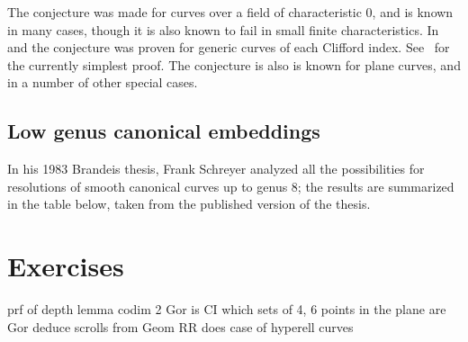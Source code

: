 The conjecture was made for curves over a field of characteristic 0, and is known in many cases, though it is also known to fail in small finite characteristics.
In \cite{MR1941089} and \cite{MR2157134} the conjecture was proven for generic curves of each Clifford index.  See~\cite{MR4022070} for the currently simplest
proof. The conjecture is also is known for plane curves, and in a number of other special cases. 

\subsection{Low genus canonical embeddings} 
In his 1983 Brandeis thesis, Frank Schreyer analyzed all the possibilities for resolutions of smooth canonical curves up to genus 8; the results are summarized in the table below, taken from the published version \cite{Schreyer-canonical} of the thesis.

\section{Exercises}
prf of depth lemma
codim 2 Gor is CI
which sets of 4, 6 points in the plane are Gor
deduce scrolls from Geom RR
does case of hyperell curves




